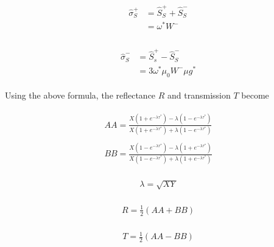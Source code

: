 \begin{eqnarray}
\begin{aligned}
\hat{\sigma}_{S}^{+} &=\hat{S}_{S}^{+}+\hat{S}_{S}^{-} \\
&=\omega^{*} W^{-} \\
\end{aligned}
\end{eqnarray}

\begin{eqnarray}
\begin{aligned}
\hat{\sigma}_{S}^{-} &=\hat{S}_{s}^{+}-\hat{S}_{S}^{-} \\
&=3 \omega^{*} \mu_{0} W^{-} \mu g^{*}
\end{aligned}
\end{eqnarray}

Using the above formula, the reflectance \(R\) and transmission \(T\) become

\begin{eqnarray}
\begin{array}{c}
A A=\frac{X\left(1+e^{-\lambda \tau^{*}}\right)-\lambda\left(1-e^{-\lambda \tau^{*}}\right)}{X\left(1+e^{-\lambda \tau^{*}}\right)+\lambda\left(1-e^{-\lambda \tau^{*}}\right)}
\end{array}
\end{eqnarray} \begin{eqnarray}
\begin{array}{c}
B B=\frac{X\left(1-e^{-\lambda \tau^{*}}\right)-\lambda\left(1+e^{-\lambda \tau^{*}}\right)}{X\left(1-e^{-\lambda \tau^{*}}\right)+\lambda\left(1+e^{-\lambda \tau^{*}}\right)}
\end{array}
\end{eqnarray}

\begin{eqnarray}
\begin{array}{c}
\lambda=\sqrt{X Y}
\end{array}
\end{eqnarray}

\begin{eqnarray}
\begin{array}{c}
R=\frac{1}{2}(A A+B B)
\end{array}
\end{eqnarray}

\begin{eqnarray}
\begin{array}{c}
T=\frac{1}{2}(A A-B B)
\end{array}
\end{eqnarray}

